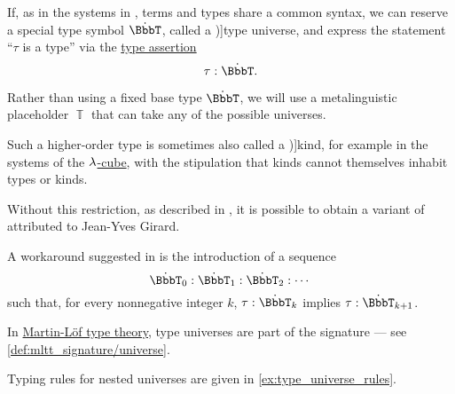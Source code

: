 \begin{concept}\label{con:type_universe}
  If, as in the systems in , terms and types share a common syntax, we can reserve a special type symbol \( \syn\BbbT \), called a \term[en=universe (\cite[\S 1.3]{UnivalentFoundationsProgram2013HoTT})]{type universe}, and express the statement \enquote{\( \tau \) is a type} via the \hyperref[def:type_assertion]{type assertion}
  \begin{equation*}
    \tau: \syn\BbbT.
  \end{equation*}

  Rather than using a fixed base type \( \syn\BbbT \), we will use a metalinguistic placeholder \( \BbbT \) that can take any of the possible universes.

  Such a higher-order type is sometimes also called a \term[en=kind (\cite[def. 5.2]{Barendregt1992LambdaCalculiWithTypes})]{kind}, for example in the systems of the \hyperref[def:lambda_cube]{\( {\mathrm \lambda} \)-cube}, with the stipulation that kinds cannot themselves inhabit types or kinds.

  Without this restriction, as described in , it is possible to obtain a variant of  attributed to Jean-Yves Girard.

  A workaround suggested in \cite[\S 1.3]{UnivalentFoundationsProgram2013HoTT} is the introduction of a sequence
  \begin{equation*}
    \syn\BbbT_0: \syn\BbbT_1: \syn\BbbT_2: \cdots
  \end{equation*}
  such that, for every nonnegative integer \( k \), \( \tau: \syn\BbbT_k \) implies \( \tau: \syn\BbbT_{k+1} \).
\end{concept}
\begin{comments}
  \item In \hyperref[def:martin_lof_type_theory]{Martin-L\"of type theory}, type universes are part of the signature --- see \cref{def:mltt_signature/universe}.

  \item Typing rules for nested universes are given in \cref{ex:type_universe_rules}.
\end{comments}

